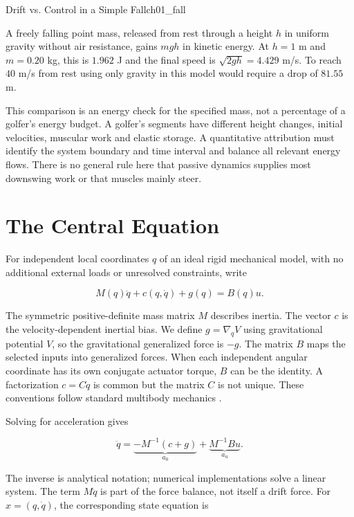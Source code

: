 \begin{principle}{Drift vs. Control in a Simple Fall}{ch01_fall}

A freely falling point mass, released from rest through a height \(h\) in uniform gravity without air resistance, gains \(mgh\) in kinetic energy. At \(h=1\) m and \(m=0.20\) kg, this is \(1.962\) J and the final speed is \(\sqrt{2gh}=4.429\) m/s. To reach \(40\) m/s from rest using only gravity in this model would require a drop of \(81.55\) m.

This comparison is an energy check for the specified mass, not a percentage of a golfer's energy budget. A golfer's segments have different height changes, initial velocities, muscular work and elastic storage. A quantitative attribution must identify the system boundary and time interval and balance all relevant energy flows. There is no general rule here that passive dynamics supplies most downswing work or that muscles mainly steer.

\end{principle}

\section{The Central Equation}\label{ch01:the-central-equation}

For independent local coordinates \(q\) of an ideal rigid mechanical model, with no additional external loads or unresolved constraints, write

\begin{equation}
M(q)\ddot q+c(q,\dot q)+g(q)=B(q)u.
\label{eq:ch01_euler_lagrange}
\end{equation}

The symmetric positive-definite mass matrix \(M\) describes inertia. The vector \(c\) is the velocity-dependent inertial bias. We define \(g=\nabla_q V\) using gravitational potential \(V\), so the gravitational generalized force is \(-g\). The matrix \(B\) maps the selected inputs into generalized forces. When each independent angular coordinate has its own conjugate actuator torque, \(B\) can be the identity. A factorization \(c=C\dot q\) is common but the matrix \(C\) is not unique. These conventions follow standard multibody mechanics \citep{TedrakeMultibodyEnergy}.

Solving for acceleration gives

\[
\ddot q=\underbrace{-M^{-1}(c+g)}_{a_0}
       +\underbrace{M^{-1}Bu}_{a_u}.
\]

The inverse is analytical notation; numerical implementations solve a linear system. The term \(M\ddot q\) is part of the force balance, not itself a drift force. For \(x=(q,\dot q)\), the corresponding state equation is

